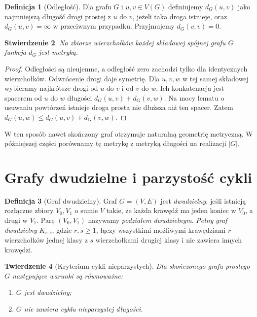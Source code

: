 \documentclass[11pt,a4paper]{report}
\numberwithin{equation}{section}
\theoremstyle{plain}
\newtheorem{twierdzenie}{Twierdzenie}[section]
\newtheorem{stwierdzenie}[twierdzenie]{Stwierdzenie}
\theoremstyle{definition}
\newtheorem{definicja}[twierdzenie]{Definicja}
\theoremstyle{remark}
\begin{document}
\begin{definicja}[Odległość]
Dla grafu $G$ i $u,v\in V(G)$ definiujemy
$d_G(u,v)$ jako najmniejszą długość drogi
prostej z $u$ do $v$, jeżeli taka droga istnieje,
oraz $d_G(u,v)=\infty$ w przeciwnym przypadku.
Przyjmujemy $d_G(v,v)=0$.
\end{definicja}

\begin{stwierdzenie}
Na zbiorze wierzchołków każdej składowej spójnej
grafu $G$ funkcja $d_G$ jest metryką.
\end{stwierdzenie}

\begin{proof}
Odległości są nieujemne, a odległość zero zachodzi
tylko dla identycznych wierzchołków. Odwrócenie
drogi daje symetrię. Dla $u,v,w$ w tej samej
składowej wybieramy najkrótsze drogi od $u$ do $v$
i od $v$ do $w$. Ich konkatenacja jest spacerem od
$u$ do $w$ długości $d_G(u,v)+d_G(v,w)$.
Na mocy lematu o usuwaniu powtórzeń istnieje droga
prosta nie dłuższa niż ten spacer. Zatem
$d_G(u,w)\le d_G(u,v)+d_G(v,w)$.
\end{proof}

W ten sposób nawet skończony graf otrzymuje naturalną
geometrię metryczną. W późniejszej części porównamy tę
metrykę z metryką długości na realizacji $|G|$.

\section{Grafy dwudzielne i parzystość cykli}
\label{sec:tg-dwudzielne}

\begin{definicja}[Graf dwudzielny]
Graf $G=(V,E)$ jest \emph{dwudzielny}, jeśli istnieją
rozłączne zbiory $V_0,V_1$ o sumie $V$ takie, że
każda krawędź ma jeden koniec w $V_0$, a drugi
w $V_1$. Parę $(V_0,V_1)$ nazywamy \emph{podziałem
dwudzielnym}. \emph{Pełny graf dwudzielny} $K_{r,s}$,
gdzie $r,s\ge1$, łączy wszystkimi możliwymi krawędziami
$r$ wierzchołków jednej klasy z $s$ wierzchołkami
drugiej klasy i nie zawiera innych krawędzi.
\end{definicja}

\begin{twierdzenie}[Kryterium cykli nieparzystych]
Dla skończonego grafu prostego $G$ następujące
warunki są równoważne:
\begin{enumerate}[label=(\roman*)]
\item $G$ jest dwudzielny;
\item $G$ nie zawiera cyklu nieparzystej długości.
\end{enumerate}
\end{twierdzenie}
\end{document}
